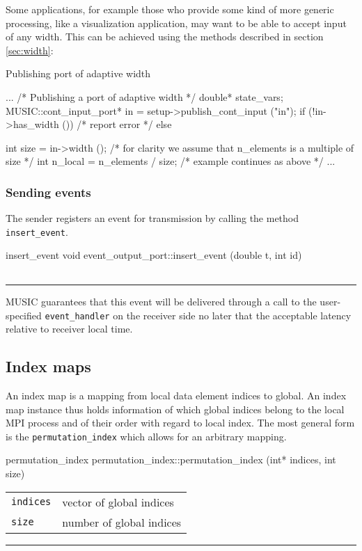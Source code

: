 \documentclass[a4paper]{report}
\makeatletter
\newenvironment{parameters}%
{\begin{tabular}{@{\hspace{2em}}lp{0.6\textwidth}}}%
{\end{tabular}\par\vspace{1mm}\par\hrule\par\vspace{5mm}}
\makeatother
\begin{document}
Some applications, for example those who provide some kind of more
generic processing, like a visualization application, may want to be
able to accept input of any width.  This can be achieved using the
methods described in section \ref{sec:width}:

\begin{code}{Publishing port of adaptive width\label{code:adaptivewidth}}
{
  ...
  /* Publishing a port of adaptive width */
  double* state_vars;
  MUSIC::cont_input_port* in =
     setup->publish_cont_input ("in");
  if (!in->has_width ())
    /* report error */
  else
    {
      int size = in->width ();
      /* for clarity we assume that n_elements
         is a multiple of size */
      int n_local = n_elements / size;
      /* example continues as above */
      ...
      
    }
}
\end{code}

\subsubsection{Sending events}

The sender registers an event for transmission by calling the method
\lstinline|insert_event|.

\begin{head}{insert_event}
  void event_output_port::insert_event (double t, int id)
\end{head}
\begin{parameters}
\end{parameters}

MUSIC guarantees that this event will be delivered through a call to
the user-specified \lstinline|event_handler| on the receiver side no
later that the acceptable latency relative to receiver local time.

\subsection{Index maps}

An index map is a mapping from local data element indices to
global. An index map instance thus holds information of which global
indices belong to the local MPI process and of their order with regard
to local index.  The most general form is the
\lstinline|permutation_index| which allows for an arbitrary mapping.

\begin{head}{permutation_index}
  permutation_index::permutation_index (int* indices,
                                        int size)
\end{head}
\begin{parameters}
  \lstinline|indices| & vector of global indices \\
  \lstinline|size| & number of global indices \\
\end{parameters}
\end{document}
